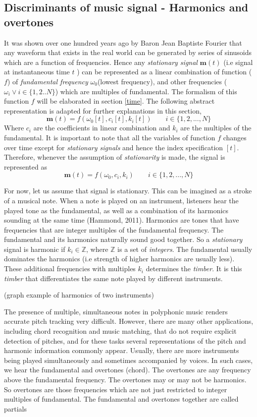\subsection{ Discriminants of music signal - Harmonics and overtones }
\label{discriminants}
It was shown over one hundred years ago by Baron Jean Baptiste Fourier that any waveform that exists in the real world can be generated by series of sinusoids which are a function of frequencies. Hence any \textit{stationary signal} $\textbf{m}(t)$ (i.e signal at instantaneous time $t$ ) can be represented as a \gls{linear combination} of function ($f$) of \textit{fundamental frequency} $\omega_{0}$(lowest frequency), and other frequencies ($\omega_{i} \vee i \in \{1,2..N\}$)  which are multiples of fundamental. The formalism of this function $f$ will be elaborated in section \ref{time}. The following abstract representation is adapted for further explanations in this section,
\[
\textbf{m}(t) = f(\omega_{0}[t], c_{i}[t], k_{i}[t]) \qquad i \in \{1, 2,..., N\}
\]
Where $c_{i}$ are the coefficients in \gls{linear combination} and $k_{i}$ are the multiples of the fundamental. It is important to note that all the variables of function $f$ changes over time except for \textit{stationary signals} and hence the index specification $[t]$. Therefore, whenever the assumption of \textit{stationarity} is made, the signal is represented as
\[
\textbf{m}(t) = f(\omega_{0}, c_{i}, k_{i}) \qquad i \in \{1, 2,..., N\}
\]  
\bigskip

\noindent For now, let us assume that signal is stationary. This can be imagined as a stroke of a musical note. When a note is played on an instrument, listeners hear the played tone as the fundamental, as well as a combination of its harmonics sounding at the same time (Hammond, 2011).  Harmonics are tones that have frequencies that are integer multiples of the fundamental frequency. The fundamental and its harmonics naturally sound good together. So a \textit{stationary} signal is harmonic if $k_{i} \in \mathbb{Z}$, where $\mathbb{Z}$ is a set of \textit{integers}. The fundamental usually dominates the harmonics (i.e strength of higher harmonics are usually less). These additional frequencies with multiples $k_{i}$ determines the \textit{timber}. It is this \textit{timber} that differentiates the same note played by different instruments. 

(graph example of harmonics of two instruments)

The presence of multiple, simultaneous notes in polyphonic music renders accurate pitch tracking very difficult. However, there are many other applications, including chord recognition and music matching, that do not require explicit detection of pitches, and for these tasks several representations of the pitch and harmonic information commonly appear. Usually, there are more instruments being played simultaneously and sometimes accompanied by voices. In such cases, we hear the fundamental and overtones (chord). The overtones are any frequency above the fundamental frequency.  The overtones may or may not be harmonics. So overtones are those frequencies which are not just restricted to integer multiples of fundamental. The fundamental and overtones together are called partials

